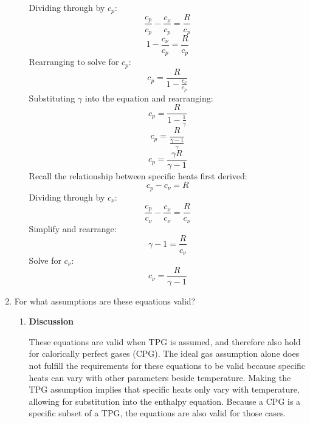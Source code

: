 \documentclass[12pt,letterpaper]{article}
\begin{document}
\begin{enumerate}[label=(\alph*)]
\begin{enumerate}[label=\arabic*.]
			Dividing through by $c_p$:
			\begin{equation*}
				\frac{c_p}{c_p} - \frac{c_{\nu}}{c_p} = \frac{R}{c_p}
			\end{equation*}
			\begin{equation*}
				1 - \frac{c_{\nu}}{c_p} = \frac{R}{c_p}
			\end{equation*}
			Rearranging to solve for $c_p$:
			\begin{equation*}
				c_p = \frac{R}{1-\frac{c_{\nu}}{c_p}}
			\end{equation*}
			Substituting $\gamma$ into the equation and rearranging:
			\begin{equation*}
				c_p = \frac{R}{1-\frac{1}{\gamma}}
			\end{equation*}
			\begin{equation*}
				c_p = \frac{R}{\frac{\gamma-1}{\gamma}}
			\end{equation*}
			\begin{equation*}
				\boxed{c_p = \frac{\gamma R}{\gamma-1}}
			\end{equation*}
			Recall the relationship between specific heats first derived:
			\begin{equation*}
				c_p - c_{\nu} = R
			\end{equation*}
			Dividing through by $c_{\nu}$:
			\begin{equation*}
				\frac{c_p}{c_{\nu}} - \frac{c_{\nu}}{c_\nu} = \frac{R}{c_\nu}
			\end{equation*}
			Simplify and rearrange:
			\begin{equation*}
				\gamma - 1 = \frac{R}{c_\nu}
			\end{equation*}
			Solve for $c_\nu$:
			\begin{equation*}
				\boxed{c_\nu = \frac{R}{\gamma -1}}
			\end{equation*}
		\end{enumerate}
		
		\item For what assumptions are these equations valid?
		\begin{enumerate}[label=\arabic*.]
			\item{\textbf{Discussion}}\\
			These equations are valid when TPG is assumed, and therefore also hold for calorically perfect gases (CPG). The ideal gas assumption alone does not fulfill the requirements for these equations to be valid because specific heats can vary with other parameters beside temperature. Making the TPG assumption implies that specific heats only vary with temperature, allowing for substitution into the enthalpy equation. Because a CPG is a specific subset of a TPG, the equations are also valid for those cases.
		\end{enumerate}
	\end{enumerate}
	\newpage
	
\end{document}
